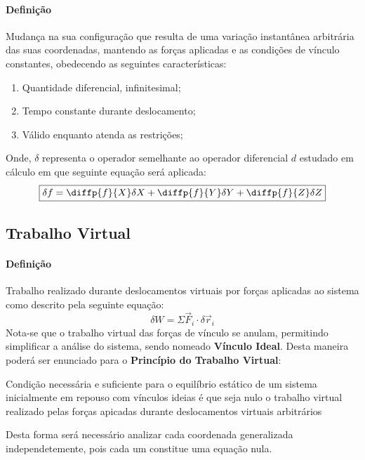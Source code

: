 \documentclass{article}
\begin{document}
            \paragraph{Definição}Mudança na sua configuração que resulta de uma variação instantânea arbitrária das suas coordenadas, mantendo as forças aplicadas e as condições de vínculo constantes, obedecendo as seguintes características:
                \begin{enumerate}[rightmargin = \leftmargin, noitemsep]
                    \item Quantidade diferencial, infinitesimal;
                    \item Tempo constante durante deslocamento;
                    \item Válido enquanto atenda as restrições;
                \end{enumerate}
            Onde, $\delta$ representa o operador semelhante ao operador diferencial $d$ estudado em cálculo em que seguinte equação será aplicada:
                \begin{equation}
                    \boxed{
                        \delta f = 
                        \diffp{f}{X}\delta X + 
                        \diffp{f}{Y}\delta Y + 
                        \diffp{f}{Z}\delta Z
                    }
                \end{equation}

        \subsection{Trabalho Virtual}
            \paragraph{Definição}Trabalho realizado durante deslocamentos virtuais por forças aplicadas ao sistema como descrito pela seguinte equação:
                \begin{equation}
                    \boxed{
                        \delta W = \Sigma\vec{F}_{i} \cdot \delta\vec{r}_{i}
                    }
                \end{equation}
            Nota-se que o trabalho virtual das forças de vínculo se anulam, permitindo simplificar a análise do sistema, sendo nomeado \textbf{Vínculo Ideal}. Desta maneira poderá ser enunciado para o \textbf{Princípio do Trabalho Virtual}:
                \begin{displayquote}[][]
                    Condição necessária e suficiente para o equilíbrio estático de um sistema inicialmente em repouso com vínculos ideias é que seja nulo o trabalho virtual realizado pelas forças apicadas durante deslocamentos virtuais arbitrários
                \end{displayquote}
            Desta forma será necessário analizar cada coordenada generalizada independetemente, pois cada um constitue uma equação nula.
\end{document}
